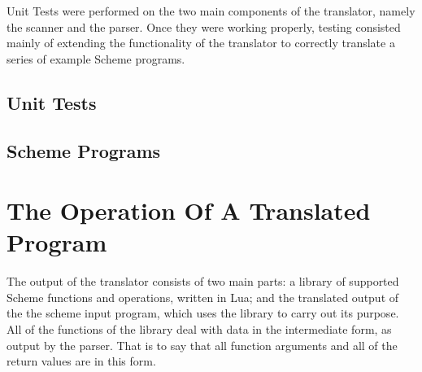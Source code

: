 Unit Tests were performed on the two main components of the translator, namely
the scanner and the parser. Once they were working properly, testing consisted
mainly of extending the functionality of the translator to correctly translate a
series of example Scheme programs.

\subsection{Unit Tests}

\subsection{Scheme Programs}


\section{The Operation Of A Translated Program}

The output of the translator consists of two main parts: a library of supported
Scheme functions and operations, written in Lua; and the translated output of
the the scheme input program, which uses the library to carry out its purpose.
All of the functions of the library deal with data in the intermediate form, as
output by the parser. That is to say that all function arguments and all of the
return values are in this form.
